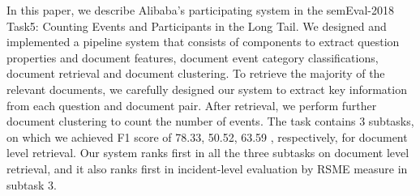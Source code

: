 In this paper, we describe Alibaba's participating system in the semEval-2018 Task5: Counting Events and Participants in the Long Tail. We designed and implemented a pipeline system that consists of components to extract question properties and document features, document event category classifications, document retrieval and document clustering. To retrieve the majority of the relevant documents, we carefully designed our system to extract key information from each question and document pair. After retrieval, we perform further document clustering to count the number of events. The task contains 3 subtasks, on which we achieved F1 score of 78.33, 50.52, 63.59 , respectively, for document level retrieval. Our system ranks first in all the three subtasks on document level retrieval, and it also ranks first in incident-level evaluation by RSME measure in subtask 3.
